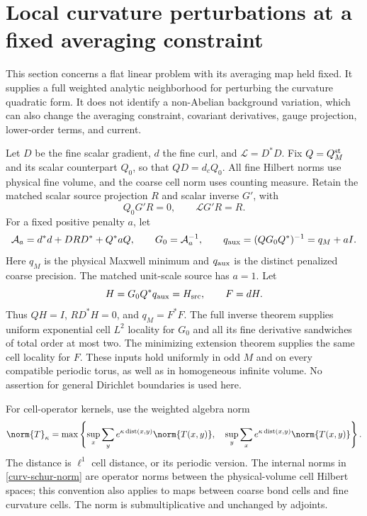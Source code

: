 \section{Local curvature perturbations at a fixed averaging constraint}
\label{curv-section}

This section concerns a flat linear problem with its averaging map held
fixed. It supplies a full weighted analytic neighborhood for perturbing
the curvature quadratic form. It does not identify a non-Abelian
background variation, which can also change the averaging constraint,
covariant derivatives, gauge projection, lower-order terms, and current.

Let $D$ be the fine scalar gradient, $d$ the fine curl, and
$\mathcal L=D^*D$. Fix $Q=Q_M^{\rm st}$ and its scalar counterpart
$Q_0$, so that $QD=d_cQ_0$. All fine Hilbert norms use physical fine
volume, and the coarse cell norm uses counting measure. Retain the
matched scalar source projection $R$ and scalar inverse $G'$, with
\begin{equation}\label{curv-scalar-identities}
 Q_0G'R=0,\qquad \mathcal L G'R=R.
\end{equation}
For a fixed positive penalty $a$, let
\begin{equation}\label{curv-fine-data}
 \mathcal A_a=d^*d+DRD^*+Q^*aQ,\qquad G_0=\mathcal A_a^{-1},
 \qquad q_{\rm aux}=(QG_0Q^*)^{-1}=q_M+aI.
\end{equation}
Here $q_M$ is the physical Maxwell minimum and $q_{\rm aux}$ is the
distinct penalized coarse precision. The matched unit-scale source
has $a=1$. Let
\begin{equation}\label{curv-extension}
 H=G_0Q^*q_{\rm aux}=H_{\rm src},\qquad F=dH.
\end{equation}
Thus $QH=I$, $RD^*H=0$, and $q_M=F^*F$.
The full inverse theorem supplies uniform exponential cell $L^2$
locality for $G_0$ and all its fine derivative sandwiches of total
order at most two. The minimizing extension theorem supplies the same
cell locality for $F$. These inputs hold uniformly in odd $M$ and on
every compatible periodic torus, as well as in homogeneous infinite
volume. No assertion for general Dirichlet boundaries is used here.

For cell-operator kernels, use the weighted algebra norm
\begin{equation}\label{curv-schur-norm}
 \norm{T}_\kappa=
 \max\left\{\sup_x\sum_y e^{\kappa\operatorname{dist}(x,y)}
                  \norm{T(x,y)},\quad
             \sup_y\sum_x e^{\kappa\operatorname{dist}(x,y)}
                  \norm{T(x,y)}\right\}.
\end{equation}
The distance is $\ell^1$ cell distance, or its periodic version.
The internal norms in \eqref{curv-schur-norm} are operator norms
between the physical-volume cell Hilbert spaces; this convention
also applies to maps between coarse bond cells and fine curvature
cells. The norm is submultiplicative and unchanged by adjoints.

